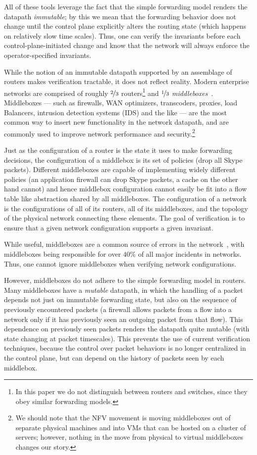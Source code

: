 All of these tools leverage the fact that the simple forwarding model renders the datapath {\em immutable}; by this we mean that the forwarding behavior does not change until the control plane explicitly alters the routing state (which happens on relatively slow time scales). Thus, one can verify the invariants before each control-plane-initiated change and know that the network will always enforce the operator-specified invariants.

While the notion of an immutable datapath supported by an assemblage of routers makes verification tractable, it does not reflect reality. Modern enterprise networks are comprised of roughly $\nicefrac{2}{3}$ routers\footnote{In this paper we do not distinguish between routers and switches, since they obey similar forwarding models.} and $\nicefrac{1}{3}$ {\em middleboxes}~\cite{sherry2012making}.  Middleboxes --- such as firewalls, WAN optimizers, transcoders, proxies, load Balancers, intrusion detection systems (IDS) and the like --- are the most common way to insert new functionality in the network datapath, and are commonly used to improve network performance and security.\footnote{We should note that the NFV movement is moving middleboxes out of separate physical machines and into VMs that can be hosted on a cluster of servers; however, nothing in the move from physical to virtual middleboxes changes our story.} 

\cbstart
Just as the configuration of a router is the state it uses to make forwarding decisions, the configuration of a middlebox is its set of policies (\eg drop all Skype packets). Different middleboxes are capable of implementing widely different policies (\eg an application firewall can drop Skype packets, a cache on the other hand cannot) and hence middlebox configuration cannot easily be fit into a flow table like abstraction shared by all middleboxes. The configuration of a network is the configurations of all of its routers, all of its middleboxes, and the topology of the physical network connecting these elements. The goal of verification is to ensure that a given network configuration supports a given invariant.
\cbend

While useful, middleboxes are a common source of errors in the network~\cite{potharaju2013demystifying}, with middleboxes being responsible for over $40\%$ of all major incidents in networks. Thus, one cannot ignore middleboxes when verifying network configurations.

However, middleboxes do not adhere to the simple forwarding model in routers. Many middleboxes have a {\em mutable} datapath, in which the handling of a packet depends not just on immutable forwarding state, but also on the sequence of previously encountered packets (\eg a firewall allows packets from a flow into a network only if it has previously seen an outgoing packet from that flow).  This dependence on previously seen packets renders the datapath quite mutable (with state changing at packet timescales). This prevents the use of current verification techniques, because the control over packet behaviors is no longer centralized in the control plane, but can depend on the history of packets seen by each middlebox.


